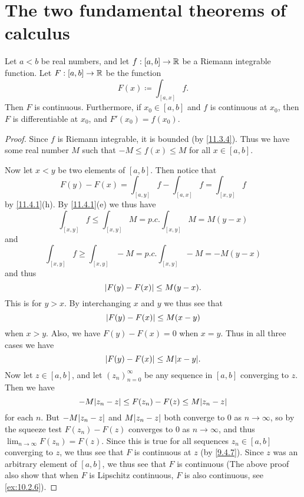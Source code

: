\section{The two fundamental theorems of calculus}\label{sec:11.9}

\begin{thm}\label{11.9.1}
  Let \(a < b\) be real numbers, and let \(f : [a, b] \to \mathbb{R}\) be a Riemann integrable function.
  Let \(F : [a, b] \to \mathbb{R}\) be the function
  \[
    F(x) \coloneqq \int_{[a, x]} f.
  \]
  Then \(F\) is continuous.
  Furthermore, if \(x_0 \in [a, b]\) and \(f\) is continuous at \(x_0\), then \(F\) is differentiable at \(x_0\), and \(F'(x_0) = f(x_0)\).
\end{thm}

\begin{proof}
  Since \(f\) is Riemann integrable, it is bounded (by \cref{11.3.4}).
  Thus we have some real number \(M\) such that \(-M \leq f(x) \leq M\) for all \(x \in [a, b]\).

  Now let \(x < y\) be two elements of \([a, b]\).
  Then notice that
  \[
    F(y) - F(x) = \int_{[a, y]} f - \int_{[a, x]} f = \int_{[x, y]} f
  \]
  by \cref{11.4.1}(h).
  By \cref{11.4.1}(e) we thus have
  \[
    \int_{[x, y]} f \leq \int_{[x, y]} M = p.c. \int_{[x, y]} M = M(y - x)
  \]
  and
  \[
    \int_{[x, y]} f \geq \int_{[x, y]} -M = p.c. \int_{[x, y]} -M = -M(y - x)
  \]
  and thus
  \[
    \left\lvert F(y) - F(x)\right\rvert \leq M(y - x).
  \]
  This is for \(y > x\).
  By interchanging \(x\) and \(y\) we thus see that
  \[
    \left\lvert F(y) - F(x)\right\rvert \leq M(x - y)
  \]
  when \(x > y\).
  Also, we have \(F(y) - F(x) = 0\) when \(x = y\).
  Thus in all
  three cases we have
  \[
    \abs{F(y) - F(x)} \leq M \abs{x - y}.
  \]
  Now let \(z \in [a, b]\), and let \((z_n)_{n = 0}^\infty\) be any sequence in \([a, b]\) converging to \(z\).
  Then we have
  \[
    -M \abs{z_n - z} \leq F(z_n) - F(z) \leq M \abs{z_n - z}
  \]
  for each \(n\).
  But \(-M \abs{z_n - z}\) and \(M \abs{z_n - z}\) both converge to \(0\) as \(n \to \infty\), so by the squeeze test \(F(z_n) - F(z)\) converges to \(0\) as \(n \to \infty\), and thus \(\lim_{n \to \infty} F(z_n) = F(z)\).
  Since this is true for all sequences \(z_n \in [a, b]\) converging to \(z\), we thus see that \(F\) is continuous at \(z\) (by \cref{9.4.7}).
  Since \(z\) was an arbitrary element of \([a, b]\), we thus see that \(F\) is continuous
  (The above proof also show that when \(F\) is Lipschitz continuous, \(F\) is also continuous, see \cref{ex:10.2.6}).


\end{proof}

